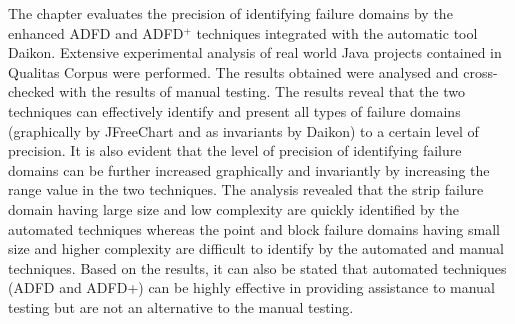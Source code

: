 The chapter evaluates the precision of identifying failure domains by the enhanced ADFD and ADFD$^+$ techniques integrated with the automatic tool Daikon. Extensive experimental analysis of real world Java projects contained in Qualitas Corpus were performed. The results obtained were analysed and cross-checked with the results of manual testing. The results reveal that the two techniques can effectively identify and present all types of failure domains (graphically by JFreeChart and as invariants by Daikon) to a certain level of precision. It is also evident that the level of precision of identifying failure domains can be further increased graphically and invariantly by increasing the range value in the two techniques. 
The analysis revealed that the strip failure domain having large size and low complexity are quickly identified by the automated techniques whereas the point and block failure domains having small size and higher complexity are difficult to identify by the automated and manual techniques. Based on the results, it can also be stated that automated techniques (ADFD and ADFD+) can be highly effective in providing assistance to manual testing but are not an alternative to the manual testing.  

















